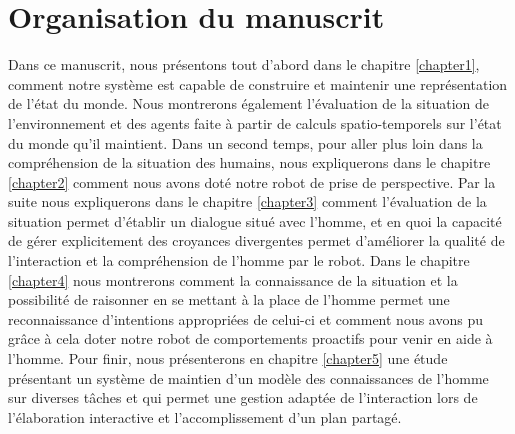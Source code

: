 \documentclass[a4paper,11pt,twoside]{StyleThese}
\begin{document}
	
	
	
 	


\section{Organisation du manuscrit}
Dans ce manuscrit, nous présentons tout d'abord dans le chapitre \ref{chapter1}, comment notre système est capable  de construire et maintenir une représentation de l'état du monde. Nous montrerons également l'évaluation de la situation de l'environnement et des agents faite à partir de calculs spatio-temporels sur l'état du monde qu'il maintient.
Dans un second temps, pour aller plus loin dans la compréhension de la situation des humains, nous expliquerons dans le chapitre \ref{chapter2} comment nous avons doté notre robot de prise de perspective.
Par la suite nous expliquerons dans le chapitre \ref{chapter3} comment l'évaluation de la situation permet d'établir un dialogue situé avec l'homme, et en quoi la capacité de gérer explicitement des croyances divergentes permet d'améliorer la qualité de l'interaction et la compréhension de l'homme par le robot.
Dans le chapitre \ref{chapter4} nous montrerons comment la connaissance de la situation et la possibilité de raisonner en se mettant à la place de l'homme permet une reconnaissance d'intentions appropriées de celui-ci et comment nous avons pu grâce à cela doter notre robot de comportements proactifs pour venir en aide à l'homme.
Pour finir, nous présenterons en chapitre \ref{chapter5} une étude présentant un système de maintien d'un modèle des connaissances de l'homme sur diverses tâches et qui permet une gestion adaptée de l'interaction lors de l'élaboration interactive et l'accomplissement d'un plan partagé.

\ifdefined{}
\else


\end{document}
